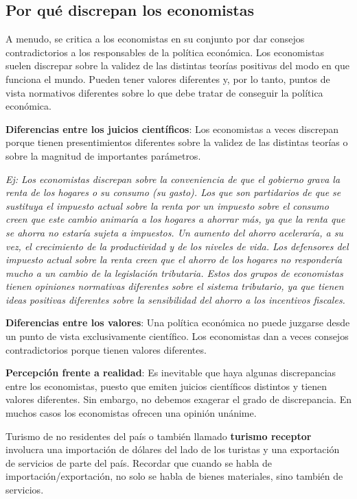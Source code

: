 \documentclass{report}
\begin{document}
\subsection{Por qué discrepan los economistas}
A menudo, se critica a los economistas en su conjunto por dar consejos contradictorios a los responsables de la política económica. Los economistas suelen discrepar sobre la validez de las distintas teorías positivas del modo en que funciona el mundo. Pueden tener valores diferentes y, por lo tanto, puntos de vista normativos diferentes sobre lo que debe tratar de conseguir la política económica.

\textbf{Diferencias entre los juicios científicos}: Los economistas a veces discrepan porque tienen presentimientos diferentes sobre la validez de las distintas teorías o sobre la magnitud de importantes parámetros.

\textit{\footnotesize Ej: Los economistas discrepan sobre la conveniencia de que el gobierno grava la renta de los hogares o su consumo (su gasto). Los que son partidarios de que se sustituya el impuesto actual sobre la renta por un impuesto sobre el consumo creen que este cambio animaría a los hogares a ahorrar más, ya que la renta que se ahorra no estaría sujeta a impuestos.
Un aumento del ahorro aceleraría, a su vez, el crecimiento de la productividad y de los niveles de vida. Los defensores del impuesto actual sobre la renta creen que el ahorro de los hogares no respondería mucho a un cambio de la legislación tributaria. Estos dos grupos de economistas tienen opiniones normativas diferentes sobre el sistema tributario, ya que tienen ideas positivas diferentes sobre la sensibilidad del ahorro a los incentivos fiscales.}

\textbf{Diferencias entre los valores}: Una política económica no puede juzgarse desde un punto de vista exclusivamente científico. Los economistas dan a veces consejos contradictorios porque tienen valores diferentes. 

\textbf{Percepción frente a realidad}: Es inevitable que haya algunas discrepancias entre los economistas, puesto que emiten juicios científicos distintos y tienen valores diferentes. Sin embargo, no debemos exagerar el grado de discrepancia. En muchos casos los economistas ofrecen una opinión unánime. 

{\footnotesize Turismo de no residentes del país o también llamado \textbf{turismo receptor} involucra una importación de dólares del lado de los turistas y una exportación de servicios de parte del país. Recordar que cuando se habla de importación/exportación, no solo se habla de bienes materiales, sino también de servicios.}
\end{document}
